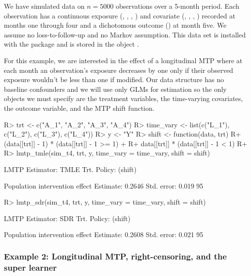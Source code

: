 \documentclass[]{jss}
\begin{document}
We have simulated data on \(n = 5000\) observations over a 5-month
period. Each observation has a continuous exposure (,
, , ) and covariate (,
, , ) recorded at months one through four
and a dichotomous outcome () at month five. We assume no
loss-to-follow-up and no Markov assumption. This data set is installed
with the package and is stored in the object .

For this example, we are interested in the effect of a longitudinal MTP
where at each month an observation's exposure decreases by one only if
their observed exposure wouldn't be less than one if modified. Our data
structure has no baseline confounders and we will use only GLMs for
estimation so the only objects we must specify are the treatment
variables, the time-varying covariates, the outcome variable, and the
MTP shift function.

\begin{CodeChunk}

\begin{CodeInput}
R> trt <- c("A_1", "A_2", "A_3", "A_4")
R> time_vary <- list(c("L_1"), c("L_2"), c("L_3"), c("L_4"))
R> y <- "Y"
R> shift <- function(data, trt) {
R+   (data[[trt]] - 1) * (data[[trt]] - 1 >= 1) + 
R+     data[[trt]] * (data[[trt]] - 1 < 1)
R+ }
R> lmtp_tmle(sim_t4, trt, y, time_vary = time_vary, shift = shift)
\end{CodeInput}

\begin{CodeOutput}
LMTP Estimator: TMLE
   Trt. Policy: (shift)

Population intervention effect
      Estimate: 0.2646
    Std. error: 0.019
        95%
\end{CodeOutput}

\begin{CodeInput}
R> lmtp_sdr(sim_t4, trt, y, time_vary = time_vary, shift = shift)
\end{CodeInput}

\begin{CodeOutput}
LMTP Estimator: SDR
   Trt. Policy: (shift)

Population intervention effect
      Estimate: 0.2608
    Std. error: 0.021
        95%
\end{CodeOutput}

\end{CodeChunk}

\hypertarget{example-2-longitudinal-mtp-right-censoring-and-the-super-learner}{%
\subsubsection{Example 2: Longitudinal MTP, right-censoring, and the
super
learner}\label{example-2-longitudinal-mtp-right-censoring-and-the-super-learner}}
\end{document}
